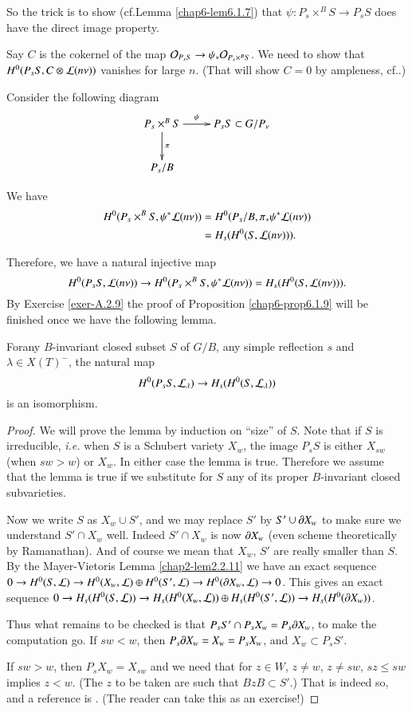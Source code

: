 So the trick is to show (cf.\@ Lemma \ref{chap6-lem6.1.7}) that
$\psi:P_{s}\times^{B}S\to P_{s}S$ does have the direct image property.

Say $C$ is the cokernel of the map $\mathcal{O}_{P_{s}S}\to
\psi_{*}\mathcal{O}_{P_{s}\times^{B}S}$. We need to show that
$H^{0}(P_{s}S,C\otimes \mathcal{L}(n\nu))$ vanishes for large $n$. (That will
show $C=0$ by ampleness, cf.\@ \cite[II 14.6 (4)]{key11}.)

Consider the following diagram
\[
\xymatrix{
P_{s}\times^{B}S\ar[d]^{\pi} \ar[r]^-{\psi} & P_{s}S\subset G/P_{\nu}\\
P_{s}/B 
}
\]

We have
\begin{align*}
H^{0}(P_{s}\times^{B}S,\psi^{*}\mathcal{L}(n\nu)) &=
H^{0}(P_{s}/B,\pi_{*}\psi^{*}\mathcal{L}(n\nu))\\ 
&= H_{s}(H^{0}(S,\mathcal{L}(n\nu))).
\end{align*}

Therefore, we have a natural injective map 
$$
H^{0}(P_{s}S,\mathcal{L}(n\nu))\to
H^{0}(P_{s}\times^{B}S,\psi^{*}\mathcal{L}(n\nu))=H_{s}(H^{0}(S,\mathcal{L}(n\nu))).
$$ 
By
Exercise \ref{exer-A.2.9} the proof of Proposition \ref{chap6-prop6.1.9} will be
finished once we have the following lemma.

\begin{lemma}\label{chap6-lem6.2.2}
For\pageoriginale any\label{page63} $B$-invariant closed subset $S$ of $G/B$, any simple
reflection $s$ and $\lambda\in X(T)^{-}$, the natural map
$$
H^{0}(P_{s}S,\mathcal{L}_{\lambda})\to H_{s}(H^{0}(S,\mathcal{L}_{\lambda}))
$$ 
is an isomorphism. 
\end{lemma}

\begin{proof}
We will prove the lemma by induction on ``size'' of $S$. Note that if
$S$ is irreducible, {\em i.e.} when $S$ is a Schubert variety $X_{w}$,
the image $P_{s}S$ is either $X_{sw}$ (when $sw>w$) or $X_{w}$. In
either case the lemma is true. Therefore we assume that the lemma is
true if we substitute for $S$ any of its proper $B$-invariant closed
subvarieties. 

Now we write $S$ as $X_{w}\cup S'$, and we may replace $S'$ by $S'\cup
\partial X_{w}$ to make sure we understand $S'\cap X_{w}$ well. Indeed
$S'\cap X_{w}$ is now $\partial X_{w}$ (even scheme theoretically by
Ramanathan). And of course we mean that $X_{w}$, $S'$ are really
smaller than $S$. By the Mayer-Vietoris Lemma \ref{chap2-lem2.2.11} we
have an exact sequence $0\to H^{0}(S,\mathcal{L})\to H^{0}(X_{w},\mathcal{L})\oplus
H^{0}(S',\mathcal{L})\to H^{0}(\partial X_{w},\mathcal{L})\to 0$. This gives an exact sequence
$0\to H_{s}(H^{0}(S,\mathcal{L}))\to H_{s}(H^{0}(X_{w},\mathcal{L}))\oplus
H_{s}(H^{0}(S',\mathcal{L}))\to H_{s}(H^{0}(\partial X_{w}))$.

Thus what remains to be checked is that $P_{s}S'\cap
P_{s}X_{w}=P_{s}\partial X_{w}$, to make the computation go. If $sw<w$, then
$P_{s}\partial X_{w}=X_{w}=P_{s}X_{w}$, and $X_{w}\subset P_{s}S'$.

If $sw>w$, then $P_{s}X_{w}=X_{sw}$ and we need that for $z\in W$,
$z\neq w$, $z\neq sw$, $sz\leq sw$ implies $z<w$. (The $z$ to be taken
are such that $BzB\subset S'$.) That is indeed so, and a reference is
\cite[5.9]{key10}. (The reader can take this as an exercise!) 
\end{proof}

